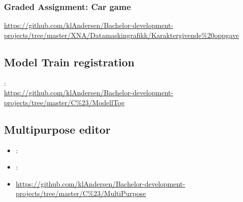 \subsubsection{Graded Assignment: Car game}
\label{sec:comp_grahphics_graded_assignment}
 \url{https://github.com/klAndersen/Bachelor-development-projects/tree/master/XNA/Datamaskingrafikk/Karaktergivende%20oppgave}

\subsection{Model Train registration}
\label{sec:model_train}
:  \\
 \url{https://github.com/klAndersen/Bachelor-development-projects/tree/master/C%23/ModellTog}

\subsection{Multipurpose editor}
\label{sec:multipurpose}
\begin{itemize} 
	\item {}: 
	\item {}: 
	\item {} \url{https://github.com/klAndersen/Bachelor-development-projects/tree/master/C%23/MultiPurpose}
\end{itemize} 
